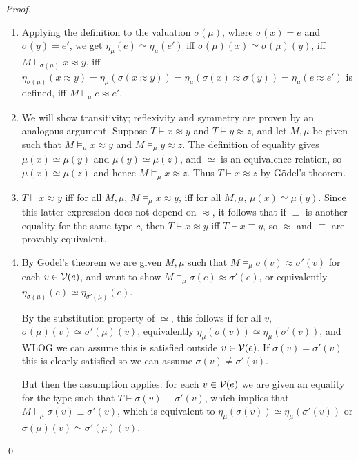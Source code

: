 \documentclass[runningheads,a4paper]{llncs}
\begin{document}
\begin{proof}\leavevmode
\begin{enumerate}
  \item Applying the definition to the valuation $\sigma(\mu)$, where $\sigma(x)=e$ and $\sigma(y)=e'$, we get $\eta_\mu(e)\simeq\eta_\mu(e')$ iff $\sigma(\mu)(x)\simeq\sigma(\mu)(y)$, iff $M\models_{\sigma(\mu)}x\approx y$, iff $\eta_{\sigma(\mu)}(x\approx y)=\eta_{\mu}(\sigma(x\approx y))=\eta_{\mu}(\sigma(x)\approx\sigma(y))=\eta_{\mu}(e\approx e')$ is defined, iff $M\models_\mu e\approx e'$. 
  \item We will show transitivity; reflexivity and symmetry are proven by an analogous argument. Suppose $T\vdash x\approx y$ and $T\vdash y\approx z$, and let $M,\mu$ be given such that $M\models_\mu x\approx y$ and $M\models_\mu y\approx z$. The definition of equality gives $\mu(x)\simeq\mu(y)$ and $\mu(y)\simeq\mu(z)$, and $\simeq$ is an equivalence relation, so $\mu(x)\simeq\mu(z)$ and hence $M\models_\mu x\approx z$. Thus $T\vdash x\approx z$ by G\"{o}del's theorem.
  \item $T\vdash x\approx y$ iff for all $M,\mu$,  $M\models_\mu x\approx y$, iff for all $M,\mu$, $\mu(x)\simeq\mu(y)$. Since this latter expression does not depend on $\approx$, it follows that if $\equiv$ is another equality for the same type $c$, then $T\vdash x\approx y$ iff $T\vdash x\equiv y$, so $\approx$ and $\equiv$ are provably equivalent.
  \item By G\"{o}del's theorem we are given $M,\mu$ such that $M\models_\mu \sigma(v)\approx\sigma'(v)$ for each $v\in{\cal V}(e)$, and want to show $M\models_\mu \sigma(e)\approx\sigma'(e)$, or equivalently $\eta_{\sigma(\mu)}(e)\simeq\eta_{\sigma'(\mu)}(e)$.
  
  By the substitution property of $\simeq$, this follows if for all $v$, $\sigma(\mu)(v)\simeq\sigma'(\mu)(v)$, equivalently $\eta_\mu(\sigma(v))\simeq\eta_\mu(\sigma'(v))$, and WLOG we can assume this is satisfied outside $v\in{\cal V}(e)$. If $\sigma(v)=\sigma'(v)$ this is clearly satisfied so we can assume $\sigma(v)\ne\sigma'(v)$.
  
  But then the assumption applies: for each $v\in{\cal V}(e)$ we are given an equality for the type such that $T\vdash\sigma(v)\equiv\sigma'(v)$, which implies that $M\models_\mu\sigma(v)\equiv\sigma'(v)$, which is equivalent to $\eta_\mu(\sigma(v))\simeq\eta_\mu(\sigma'(v))$ or $\sigma(\mu)(v)\simeq\sigma'(\mu)(v)$.
\end{enumerate}
\qed\end{proof}
\end{document}
